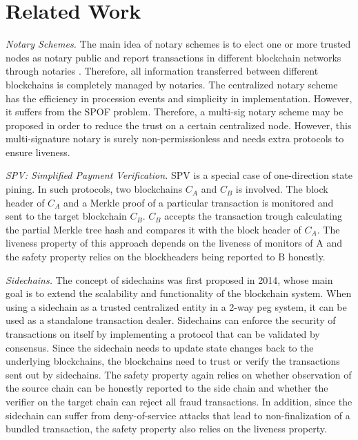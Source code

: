 \section{Related Work}
\label{chp:related-work}
\noindent
\emph{Notary Schemes.} The main idea of notary schemes is to elect one or more trusted nodes as notary public and report transactions in different blockchain networks through notaries \cite{qin2018overview}. Therefore, all information transferred between different blockchains is completely managed by notaries. The centralized notary scheme has the efficiency in procession events and simplicity in implementation. However, it suffers from the SPOF problem. Therefore, a multi-sig notary scheme may be proposed in order to reduce the trust on a certain centralized node. However, this multi-signature notary is surely non-permissionless and needs extra protocols to ensure liveness.

\smallskip\noindent\emph{SPV: Simplified Payment Verification.}
SPV is a special case of one-direction state pining. In such protocols, two blockchains $C_A$ and $C_B$ is involved. The block header of $C_A$ and a Merkle proof of a particular transaction is monitored and sent to the target blockchain $C_B$. $C_B$ accepts the transaction trough calculating the partial Merkle tree hash and compares it with the block header of $C_A$. The liveness property of this approach depends on the liveness of monitors of A and the safety property relies on the blockheaders being reported to B honestly. 
    
\smallskip\noindent\emph{Sidechains.}
The concept of sidechains was first proposed in 2014\cite{singh2020sidechain}, whose main goal is to extend the scalability and functionality of the blockchain system. When using a sidechain as a trusted centralized entity in a 2-way peg system, it can be used as a standalone transaction dealer. 
Sidechains can enforce the security of transactions on itself by implementing a protocol that can be validated by consensus. Since the sidechain needs to update state changes back to the underlying blockchains, the blockchains need to trust or verify the transactions sent out by sidechains. The safety property again relies on whether observation of the source chain can be honestly reported to the side chain and whether the verifier on the target chain can reject all fraud transactions. In addition, since the sidechain can suffer from deny-of-service attacks that lead to non-finalization of a bundled transaction, the safety property also relies on the liveness property.

